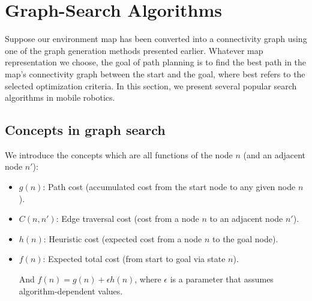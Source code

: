 \documentclass[twoside]{article}
\begin{document}
\section{Graph-Search Algorithms}
Suppose our environment map has been converted into a connectivity graph using one of the graph generation methods presented earlier. Whatever map representation we choose, the goal of path planning is to find the best path in the map’s connectivity graph between the start and the goal, where best refers to the selected optimization criteria. In this section, we present several popular search algorithms in mobile robotics.

\subsection{Concepts in graph search}
We introduce the concepts which are all functions of the node $n$ (and an adjacent node $n'$):
\begin{itemize}
    \item $g(n)$: Path cost (accumulated cost from the start node to any given node $n$).
    
    \item $C(n, n')$: Edge traversal cost (cost from a node $n$ to an adjacent node $n'$).
    
    \item $h(n)$: Heuristic cost (expected cost from a node $n$ to the goal node).
    
    \item$f(n)$: Expected total cost (from start to goal via state $n$).

And $f(n) = g(n) + \epsilon h(n)$, where $\epsilon$ is a parameter that assumes algorithm-dependent values.
\end{itemize}
\end{document}
